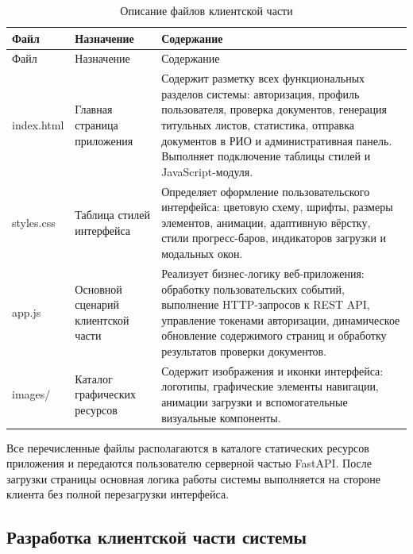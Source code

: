 \begin{xltabular}{\textwidth}{|l|X|X|}
	\caption{Описание файлов клиентской части\label{tab:client_files}}\\
	\hline
	Файл & Назначение & Содержание \\ \hline
	\endfirsthead
	
	\hline
	Файл & Назначение & Содержание \\ \hline
	\endhead
	
	\hline
	\endlastfoot
	
	index.html &
	Главная страница приложения &
	Содержит разметку всех функциональных разделов системы: авторизация, профиль пользователя, проверка документов, генерация титульных листов, статистика, отправка документов в РИО и административная панель. Выполняет подключение таблицы стилей и JavaScript-модуля. \\ \hline
	
	styles.css &
	Таблица стилей интерфейса &
	Определяет оформление пользовательского интерфейса: цветовую схему, шрифты, размеры элементов, анимации, адаптивную вёрстку, стили прогресс-баров, индикаторов загрузки и модальных окон. \\ \hline
	
	app.js &
	Основной сценарий клиентской части &
	Реализует бизнес-логику веб-приложения: обработку пользовательских событий, выполнение HTTP-запросов к REST API, управление токенами авторизации, динамическое обновление содержимого страниц и обработку результатов проверки документов. \\ \hline
	
	images/ &
	Каталог графических ресурсов &
	Содержит изображения и иконки интерфейса: логотипы, графические элементы навигации, анимации загрузки и вспомогательные визуальные компоненты. \\ \hline
	
\end{xltabular}

Все перечисленные файлы располагаются в каталоге статических ресурсов приложения и передаются пользователю серверной частью FastAPI. После загрузки страницы основная логика работы системы выполняется на стороне клиента без полной перезагрузки интерфейса.



\subsection{Разработка клиентской части системы}

